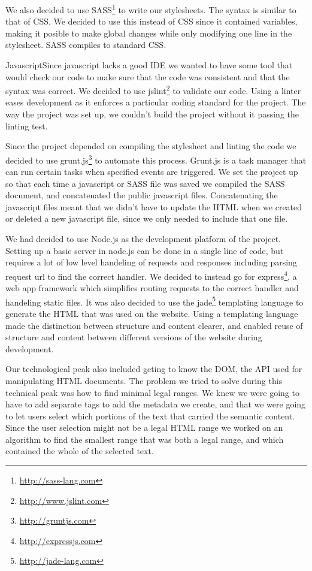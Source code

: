 We also decided to use SASS\footnote{\url{http://sass-lang.com}} to write our stylesheets.
The syntax is similar to that of CSS.
We decided to use this instead of CSS since it contained variables,
making it posible to make global changes while only modifying one line in the stylesheet.
SASS compiles to standard CSS.

JavascriptSince javascript lacks a good IDE we wanted to have some tool that would check our code to make sure that the
code was consistent and that the syntax was correct.
We decided to use jslint\footnote{\url{http://www.jslint.com}} to validate our code.
Using a linter eases development as it enforces a particular coding standard for the project.
The way the project was set up, we couldn't build the project without it passing the linting test.

Since the project depended on compiling the stylesheet and linting the code we decided to use grunt.js\footnote{\url{http://gruntjs.com}}
to automate this process.
Grunt.js is a task manager that can run certain tasks when specified events are triggered.
We set the project up so that each time a javascript or SASS file was saved we compiled the SASS document,
and concatenated the public javascript files.
Concatenating the javascript files meant that we didn't have to update the HTML when we created or deleted a new
javascript file, since we only needed to include that one file.

We had decided to use Node.js as the development platform of the project.
Setting up a basic server in node.js can be done in a single line of code,
but requires a lot of low level handeling of requests and responses
including parsing request url to find the correct handler.
We decided to instead go for express\footnote{\url{http://expressjs.com}},
a web app framework which simplifies routing requests to the correct handler and handeling static files.
It was also decided to use the jade\footnote{\url{http://jade-lang.com}}
templating language to generate the HTML that was used on the website.
Using a templating language made the distinction between structure and content clearer,
and enabled reuse of structure and content between different versions of the website during development.

Our technological peak also included geting to know the DOM, the API used for manipulating HTML documents.
The problem we tried to solve during this technical peak was how to find minimal legal ranges.
We knew we were going to have to add separate tags to add the metadata we create,
and that we were going to let users select which portions of the text that carried the semantic content.
Since the user selection might not be a legal HTML range we worked on an algorithm to find the smallest range that
was both a legal range, and which contained the whole of the selected text.


